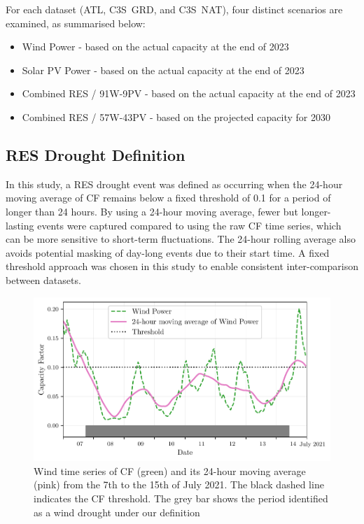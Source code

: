 \documentclass[preprint, 12pt]{elsarticle}
\begin{document}
For each dataset (ATL, C3S~GRD, and C3S~NAT), four distinct scenarios are examined, as summarised below:

\begin{itemize}
	\item Wind Power - based on the actual capacity at the end of 2023
	\item Solar PV Power - based on the actual capacity at the end of 2023
	\item Combined RES / 91W-9PV - based on the actual capacity at the end of 2023
	\item Combined RES / 57W-43PV - based on the projected capacity for 2030
\end{itemize}

\subsection{RES Drought Definition}
\label{sec:res_drought}

In this study, a RES drought event was defined as occurring when the 24-hour moving average of CF remains below a fixed threshold of 0.1 for a period of longer than 24 hours. By using a 24-hour moving average, fewer but longer-lasting events were captured compared to using the raw CF time series, which can be more sensitive to short-term fluctuations. The 24-hour rolling average also avoids potential masking of day-long events due to their start time. A fixed threshold approach was chosen in this study to enable consistent inter-comparison between datasets.

\begin{figure}[ht!]
	\centering
	\includegraphics[width=\textwidth]{droughts_methodology.pdf}
	\caption{Wind time series of CF (green) and its 24-hour moving average (pink) from the 7th to the 15th of July 2021. The black dashed line indicates the CF threshold. The grey bar shows the period identified as a wind drought under our definition}
	\label{fig:find_res_droughts}
\end{figure}
\end{document}
